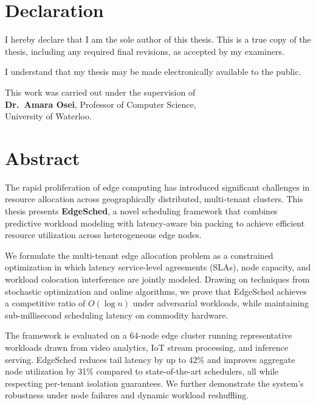 \documentclass[12pt,letterpaper,twoside]{report}
\begin{document}

\chapter*{Declaration}

I hereby declare that I am the sole author of this thesis. This is a true copy of the thesis, including any required final revisions, as accepted by my examiners.

I understand that my thesis may be made electronically available to the public.

\vspace{2\baselineskip}
\noindent This work was carried out under the supervision of\\[6pt]
\textbf{Dr.~Amara Osei}, Professor of Computer Science,\\[2pt]
University of Waterloo.

\chapter*{Abstract}

The rapid proliferation of edge computing has introduced significant challenges in resource allocation across geographically distributed, multi-tenant clusters. This thesis presents \textbf{EdgeSched}, a novel scheduling framework that combines predictive workload modeling with latency-aware bin packing to achieve efficient resource utilization across heterogeneous edge nodes.

We formulate the multi-tenant edge allocation problem as a constrained optimization in which latency service-level agreements (SLAs), node capacity, and workload colocation interference are jointly modeled. Drawing on techniques from stochastic optimization and online algorithms, we prove that EdgeSched achieves a competitive ratio of \(O(\log n)\) under adversarial workloads, while maintaining sub-millisecond scheduling latency on commodity hardware.

The framework is evaluated on a 64-node edge cluster running representative workloads drawn from video analytics, IoT stream processing, and inference serving. EdgeSched reduces tail latency by up to 42\% and improves aggregate node utilization by 31\% compared to state-of-the-art schedulers, all while respecting per-tenant isolation guarantees. We further demonstrate the system's robustness under node failures and dynamic workload reshuffling.
\end{document}
